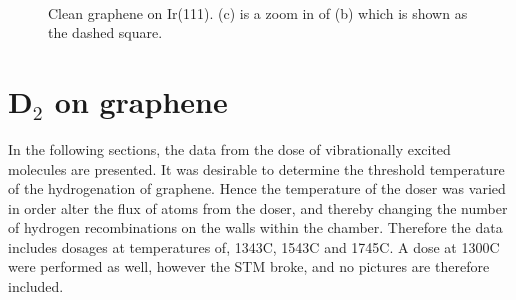 \begin{figure}[H]
  \\
\caption{Clean graphene on Ir(111). (c) is a zoom in of (b) which is shown as the dashed square.}
\label{GrIr}
\end{figure}

\section{D$_2$ on graphene}

In the following sections, the data from the dose of vibrationally excited molecules are presented. It was desirable to determine the threshold temperature of the hydrogenation of graphene. Hence the temperature of the doser was varied in order alter the flux of atoms from the doser, and thereby changing the number of hydrogen recombinations on the walls within the chamber. Therefore the data includes dosages at temperatures of, 1343\degree C, 1543\degree C and 1745\degree C. A dose at 1300\degree C were performed as well, however the STM broke, and no pictures are therefore included.

